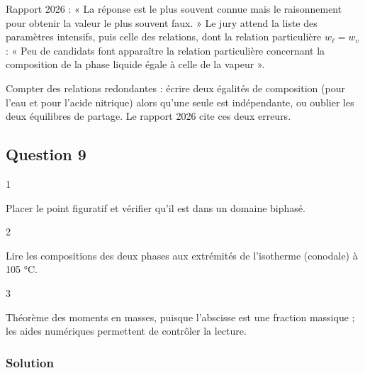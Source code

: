 \documentclass[11pt,a4paper]{article}
\begin{document}
\begin{jury}

Rapport 2026 : « La réponse est le plus souvent connue mais le raisonnement pour obtenir la valeur le plus souvent faux. » Le jury attend la liste des paramètres intensifs, puis celle des relations, dont la relation particulière \(w_\ell=w_v\) : « Peu de candidats font apparaître la relation particulière concernant la composition de la phase liquide égale à celle de la vapeur ».

\end{jury}

\begin{piege}

Compter des relations redondantes : écrire deux égalités de composition (pour l'eau et pour l'acide nitrique) alors qu'une seule est indépendante, ou oublier les deux équilibres de partage. Le rapport 2026 cite ces deux erreurs.

\end{piege}

\hypertarget{question-9}{%
\subsection{Question 9}\label{question-9}}

\begin{indication}{1}

Placer le point figuratif et vérifier qu'il est dans un domaine biphasé.

\end{indication}

\begin{indication}{2}

Lire les compositions des deux phases aux extrémités de l'isotherme (conodale) à 105 °C.

\end{indication}

\begin{indication}{3}

Théorème des moments en masses, puisque l'abscisse est une fraction massique ; les aides numériques permettent de contrôler la lecture.

\end{indication}

\hypertarget{solution-8}{%
\subsubsection{Solution}\label{solution-8}}
\end{document}
